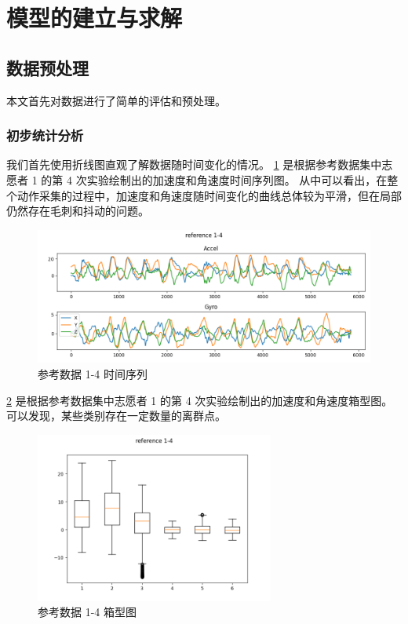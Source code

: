 \documentclass[withoutpreface]{cumcmthesis}
\begin{document}
\section{模型的建立与求解}

\subsection{数据预处理}

本文首先对数据进行了简单的评估和预处理。

\subsubsection{初步统计分析}

我们首先使用折线图直观了解数据随时间变化的情况。
\cref{fig:reference-1-4} 是根据参考数据集中志愿者 1 的第 4 次实验绘制出的加速度和角速度时间序列图。
从中可以看出，在整个动作采集的过程中，加速度和角速度随时间变化的曲线总体较为平滑，但在局部仍然存在毛刺和抖动的问题。

\begin{figure}[!htbp]
    \centering
    \includegraphics[width=\textwidth]{figures/reference-1-4.png}
    \caption{参考数据 1-4 时间序列}
    \label{fig:reference-1-4}
\end{figure}

\cref{fig:reference-1-4-boxplot} 是根据参考数据集中志愿者 1 的第 4 次实验绘制出的加速度和角速度箱型图。
可以发现，某些类别存在一定数量的离群点。

\begin{figure}
    \centering
    \includegraphics[width=0.7\textwidth]{figures/reference-1-4-boxplot.png}
    \caption{参考数据 1-4 箱型图}
    \label{fig:reference-1-4-boxplot}
\end{figure}
\end{document}
